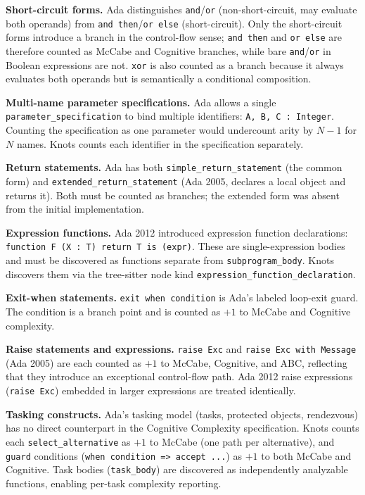 \documentclass[10pt,twocolumn,letterpaper]{article}
\begin{document}
\textbf{Short-circuit forms.}  Ada distinguishes \texttt{and}/\texttt{or}
(non-short-circuit, may evaluate both operands) from \texttt{and~then}/\texttt{or~else}
(short-circuit).  Only the short-circuit forms introduce a branch in the
control-flow sense; \texttt{and then} and \texttt{or else} are therefore
counted as McCabe and Cognitive branches, while bare \texttt{and}/\texttt{or}
in Boolean expressions are not.  \texttt{xor} is also counted as a branch
because it always evaluates both operands but is semantically a conditional
composition.

\textbf{Multi-name parameter specifications.}  Ada allows a single
\texttt{parameter\_specification} to bind multiple identifiers:
\texttt{A, B, C : Integer}.  Counting the specification as one parameter
would undercount arity by $N-1$ for $N$ names.  Knots counts each
identifier in the specification separately.

\textbf{Return statements.}  Ada has both \texttt{simple\_return\_statement}
(the common form) and \texttt{extended\_return\_statement} (Ada 2005,
declares a local object and returns it).  Both must be counted as branches;
the extended form was absent from the initial implementation.

\textbf{Expression functions.}  Ada 2012 introduced expression function
declarations: \texttt{function F (X : T) return T is (expr)}.  These are
single-expression bodies and must be discovered as functions separate from
\texttt{subprogram\_body}.  Knots discovers them via the tree-sitter node
kind \texttt{expression\_function\_declaration}.

\textbf{Exit-when statements.}  \texttt{exit when condition} is Ada's
labeled loop-exit guard.  The condition is a branch point and is counted
as $+1$ to McCabe and Cognitive complexity.

\textbf{Raise statements and expressions.}  \texttt{raise Exc} and
\texttt{raise Exc with Message} (Ada 2005) are each counted as $+1$ to
McCabe, Cognitive, and ABC, reflecting that they introduce an exceptional
control-flow path.  Ada 2012 raise expressions (\texttt{raise Exc})
embedded in larger expressions are treated identically.

\textbf{Tasking constructs.}  Ada's tasking model (tasks, protected objects,
rendezvous) has no direct counterpart in the Cognitive Complexity
specification.  Knots counts each \texttt{select\_alternative} as $+1$
to McCabe (one path per alternative), and \texttt{guard} conditions
(\texttt{when condition => accept ...}) as $+1$ to both McCabe and
Cognitive.  Task bodies (\texttt{task\_body}) are discovered as
independently analyzable functions, enabling per-task complexity reporting.
\end{document}
